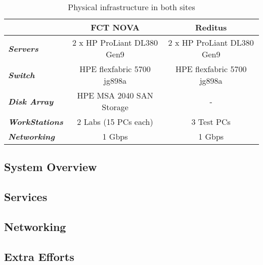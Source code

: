 \begin{table}[htpb]
\centering
\begin{tabular}{lcc}
\hline
                               & \textbf{FCT NOVA}          & \textbf{Reditus}           \\ \hline
\textit{\textbf{Servers}}      & 2 x HP ProLiant DL380 Gen9 & 2 x HP ProLiant DL380 Gen9 \\
\textit{\textbf{Switch}}       & HPE flexfabric 5700 jg898a & HPE flexfabric 5700 jg898a \\
\textit{\textbf{Disk Array}}   & HPE MSA 2040 SAN Storage   & -                          \\
\textit{\textbf{WorkStations}} & 2 Labs (15 PCs each)       & 3 Test PCs                 \\
\textit{\textbf{Networking}}   & 1 Gbps                     & 1 Gbps                     \\ \hline
\end{tabular}
\caption{Physical infrastructure in both sites}
\end{table}


\subsection{System Overview}
\label{sub:system_overview}

\subsection{Services}
\label{sub:cache_services}


\subsection{Networking}
\label{sub:cache_networking}

\subsection{Extra Efforts}
\label{sub:extra_efforts}

